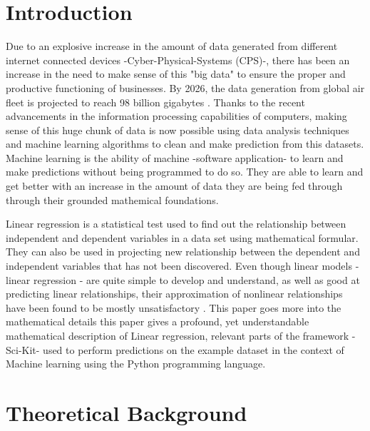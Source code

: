\documentclass[conference]{IEEEtran}
\begin{document}
\section{Introduction}
Due to an explosive increase in the amount of data generated from different internet connected devices -Cyber-Physical-Systems (CPS)-, there has been an increase in the need to make sense of this "big data" to ensure the proper and productive functioning of businesses. By 2026, the data generation from global air fleet is projected to reach 98 billion gigabytes \cite{oliver_wyman}. Thanks to the recent advancements in the information processing capabilities of computers, making sense of this huge chunk of data is now possible using data analysis techniques and machine learning algorithms to clean and make prediction from this datasets. Machine learning is the ability of machine -software application- to learn and make predictions without being programmed to do so. They are able to learn and get better with an increase in the amount of data they are being fed through through their grounded mathemical foundations.

\quad Linear regression is a statistical test used to find out the relationship between independent and dependent variables in a data set using mathematical formular. They can also be used in projecting new relationship between the dependent and independent variables that has not been discovered.
Even though linear models - linear regression - are quite simple to develop and understand, as well as good at predicting linear relationships, their approximation of nonlinear relationships have been found to be mostly unsatisfactory \cite{article_lee}. This paper goes more into the mathematical details 
this paper gives a profound, yet understandable mathematical description of Linear regression, relevant parts of the framework -Sci-Kit- used to perform predictions on the example dataset in the context of Machine learning using the Python programming language.

\section{Theoretical Background}
\end{document}

